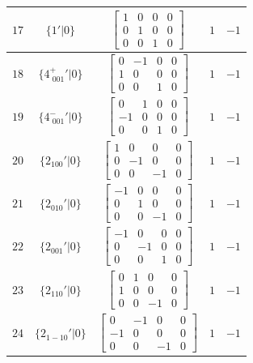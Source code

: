 \documentclass[fleqn,8pt]{jsarticle}
\begin{document}
\begin{longtable}{ccccc}
$ 17 $ & $ \{1{}'|0\} $ & $ \begin{bmatrix} 1 & 0 & 0 & 0 \\ 0 & 1 & 0 & 0 \\ 0 & 0 & 1 & 0 \end{bmatrix} $ & $ 1 $ & $ -1 $ \\ \hline
$ 18 $ & $ \{4^{+}_{\,\,001}{}'|0\} $ & $ \begin{bmatrix} 0 & -1 & 0 & 0 \\ 1 & 0 & 0 & 0 \\ 0 & 0 & 1 & 0 \end{bmatrix} $ & $ 1 $ & $ -1 $ \\ \hline
$ 19 $ & $ \{4^{-}_{\,\,001}{}'|0\} $ & $ \begin{bmatrix} 0 & 1 & 0 & 0 \\ -1 & 0 & 0 & 0 \\ 0 & 0 & 1 & 0 \end{bmatrix} $ & $ 1 $ & $ -1 $ \\ \hline
$ 20 $ & $ \{2{}_{100}{}'|0\} $ & $ \begin{bmatrix} 1 & 0 & 0 & 0 \\ 0 & -1 & 0 & 0 \\ 0 & 0 & -1 & 0 \end{bmatrix} $ & $ 1 $ & $ -1 $ \\ \hline
$ 21 $ & $ \{2{}_{010}{}'|0\} $ & $ \begin{bmatrix} -1 & 0 & 0 & 0 \\ 0 & 1 & 0 & 0 \\ 0 & 0 & -1 & 0 \end{bmatrix} $ & $ 1 $ & $ -1 $ \\ \hline
$ 22 $ & $ \{2{}_{001}{}'|0\} $ & $ \begin{bmatrix} -1 & 0 & 0 & 0 \\ 0 & -1 & 0 & 0 \\ 0 & 0 & 1 & 0 \end{bmatrix} $ & $ 1 $ & $ -1 $ \\ \hline
$ 23 $ & $ \{2{}_{110}{}'|0\} $ & $ \begin{bmatrix} 0 & 1 & 0 & 0 \\ 1 & 0 & 0 & 0 \\ 0 & 0 & -1 & 0 \end{bmatrix} $ & $ 1 $ & $ -1 $ \\ \hline
$ 24 $ & $ \{2{}_{1-10}{}'|0\} $ & $ \begin{bmatrix} 0 & -1 & 0 & 0 \\ -1 & 0 & 0 & 0 \\ 0 & 0 & -1 & 0 \end{bmatrix} $ & $ 1 $ & $ -1 $ \\ \hline

\end{longtable}
\end{document}
